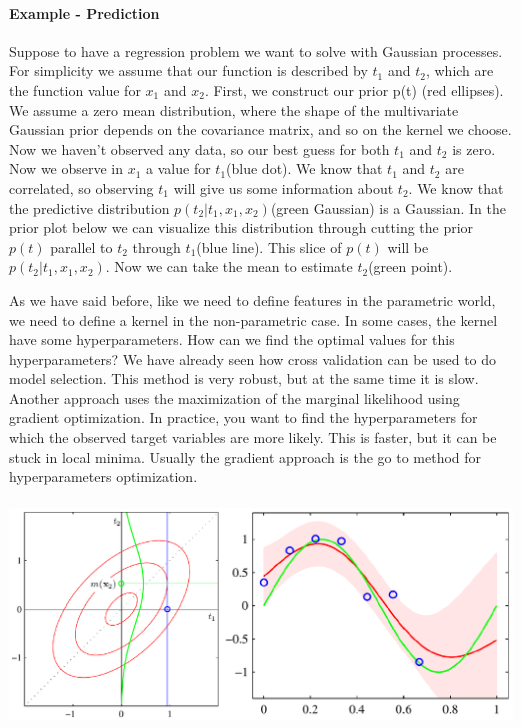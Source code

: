 \documentclass[main.tex]{subfiles}
\begin{document}
\paragraph{Example - Prediction} Suppose to have a regression problem we want to solve with Gaussian processes. For simplicity we assume that our function is described by $t_1$ and $t_2$, which are the function value for $x_1$ and $x_2$.
First, we construct our prior p(t) (red ellipses). We assume a zero mean distribution, where the shape of the multivariate Gaussian prior depends on the covariance matrix, and so on the kernel we choose. Now we haven't observed any data, so our best guess for both $t_1$ and $t_2$ is zero. Now we observe in $x_1$ a value for $t_1$(blue dot). We know that $t_1$ and $t_2$ are correlated, so observing $t_1$ will give us some information about $t_2$. We know that the predictive distribution $p(t_2|t_1, x_1, x_2)$(green Gaussian) is a Gaussian. In the prior plot below we can visualize this distribution through cutting the prior $p(t)$ parallel to $t_2$ through $t_1$(blue line). This slice of $p(t)$ will be $p(t_2|t_1, x_1, x_2)$. Now we can take the mean to estimate $t_2$(green point).

As we have said before, like we need to define features in the parametric world, we need to define a kernel in the non-parametric case. In some cases, the kernel have some hyperparameters. How can we find the optimal values for this hyperparameters?
We have already seen how cross validation can be used to do model selection. This method is very robust, but at the same time it is slow. Another approach uses the maximization of the marginal likelihood using gradient optimization. In practice, you want to find the hyperparameters for which the observed target variables are more likely. This is faster, but it can be stuck in local minima. Usually the gradient approach is the go to method for hyperparameters optimization.
\begin{center}
    \includegraphics[height=60mm]{img/GaussianProcessExample.PNG}
\end{center}

\newpage
\end{document}
